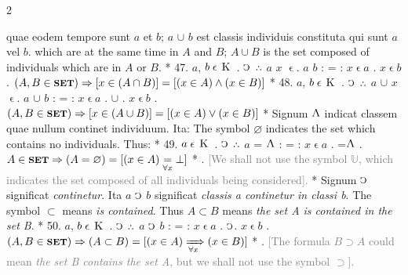 \documentclass{book}
\newcommand{\C}{\mathop{\sbox0{$\displaystyle$$\reflectbox{C}$} %
\raisebox{-\height+\ht0-0.05cm}[\ht0][\dp0]{\scalebox{0.8}[0.8]{\copy0}}}\displaylimits} %
\newcommand{\pppNoSpace}{\leavevmode\lower0ex\hbox{.}\kern-0.1em\raise0.7ex\hbox{.}\kern-0.1em\lower0ex\hbox{.}} %
\newcommand{\abs}{\mathop{\rotatebox[origin=c]{180}{V}}}
\newcommand{\smallIn}{\ensuremath{\mathrel{\epsilon}}}
\newcommand{\K}{\mathop{\thinspace \text{K} \thinspace}}
\newcommand{\setOfSets}{\mathop{\text{{\footnotesize \textbf{SET}}}}}
\renewcommand{\rightarrow}{\Rightarrow}
\renewcommand{\xrightarrow}{\xRightarrow}
\newcommand\irrelevant[1]{\textcolor{gray}{#1}}
\newenvironment{translateTwoCol}
               { %
                 \columnratio{0.5, 0.5}
                 \begin{paracol}{2}
                 \newcommand{\LAT}{\switchcolumn[0]*}
                 \newcommand{\ENG}{\switchcolumn[1]}
               }
               { %
                 \let\ENG\undefined
                 \let\LAT\undefined
                 \end{paracol}
               }
\begin{document}
\begin{translateTwoCol}
quae eodem tempore sunt $a$ et $b$; $a$ $\cup$ $b$ est classis individuis constituta qui sunt $a$ vel $b$.
\ENG
which are at the same time in $A$ and $B$; $A \cup B$ is the set composed of individuals which are in $A$ or $B$.
\LAT
47. \hspace{0.67cm} $a$, $b \smallIn \K$ . $\C$ $\pppNoSpace$ $a$ $x$ \smallIn . $a$ $b$ : = : $x \smallIn a$ . $x \smallIn b$
\ENG
47. \hspace{0.67cm} $(A, B \in \setOfSets) \rightarrow [x \in (A \cap B)] = [(x \in A) \wedge (x \in B)]$
\LAT
48. \hspace{0.67cm} $a$, $b \smallIn \K$ . $\C$ $\pppNoSpace$ $a$ $\cup$ $x$ \smallIn . $a$ $\cup$ $b$ : = : $x \smallIn a$ . $\cup$ . $x \smallIn b$
\ENG
48. \hspace{0.67cm} $(A, B \in \setOfSets) \rightarrow  [x \in (A \cup B)] = [(x \in A) \vee (x \in B)]$
\LAT
\quad Signum $\abs$ indicat classem quae nullum continet individuum. Ita:
\ENG
\quad The symbol $\varnothing$ indicates the set which contains no individuals. Thus:
\LAT
49. \hspace{0.67cm} $a \smallIn \K$ . $\C$ $\pppNoSpace$ $a$ = $\abs$ : = : $x \smallIn a$ . =\thinspace  $\abs$
\ENG
49. \hspace{0.67cm} $A \in \setOfSets \rightarrow (A= \varnothing) = [(x \in A) \underset{\forall x}= \bot]$ 
\LAT
{}.
\ENG
\quad \irrelevant{[We shall not use the symbol $\mathbb{U}$, which indicates the set composed of all individuals being considered].}
\LAT
\quad Signum $\C$ significat \emph{continetur}. Ita $a$ $\C$ $b$ significat \emph{classis a continetur in classi b}.
\ENG
\quad The symbol $\subset$ means \emph{is contained}. Thus $A \subset B$ means \emph{the set A is contained in the set B}.
\LAT
50. \hspace{0.67cm} $a$, $b \smallIn \K$ . $\C$ $\pppNoSpace$ $a$ $\C$ $b$ : = : $x \smallIn a$ . $\C$\thinspace . $x \smallIn b$
\ENG
50. \hspace{0.67cm} $(A, B \in \setOfSets) \rightarrow (A \subset B)=[(x\in A) \xrightarrow[\forall x]{} (x \in B)]$
\LAT
{}.
\ENG
\quad \irrelevant{[The formula $B \supset A$ could mean \emph{the set B contains the set A}, but we shall not use the symbol $\supset$].}

\end{translateTwoCol}
\end{document}

